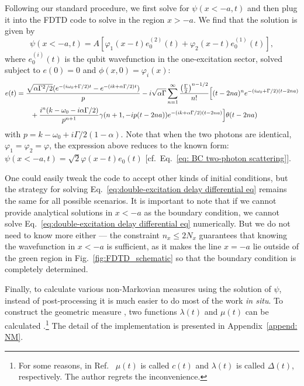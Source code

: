 \documentclass[12pt,letter,onecolumn,notitlepage]{article}
\begin{document}
\begin{enumerate}
Following our standard procedure, we first solve for $\psi(x<-a, t)$ and then plug it into the FDTD code to solve in the region $x>-a$. We find that the solution is given by \cite{OurBIC}
\begin{equation}
\psi(x<-a, t) = A \left[\varphi_1(x-t) e_0^{(2)}(t) + \varphi_2(x-t) e_0^{(1)}(t) \right],
\end{equation}
where $e_0^{(i)}(t)$ is the qubit wavefunction in the one-excitation sector, solved subject to $e(0)=0$ and $\phi(x,0)=\varphi_i(x)$:
\begin{align}
e(t)&=\frac{\sqrt{\alpha\Gamma^2/2} (e^{-(i\omega_0+\Gamma /2)t}-e^{-(ik+\alpha\Gamma/2)t})}{p} 
-i\sqrt{\alpha\Gamma} \sum_{n=1}^{\infty}\frac{\left(\frac{\Gamma}{2}\right)^{n-1/2}}{n!}
\Bigl[(t-2na)^n e^{-(i\omega_0+\Gamma/2)(t-2na)}\nonumber \\
&\quad\quad+\frac{i^n(k-\omega_0-i\alpha\Gamma/2)}{p^{n+1}}\gamma(n+1,-ip(t-2na))e^{-(ik+\alpha\Gamma/2)(t-2na)}
\Bigr]\theta(t-2na)
\label{eq:exact solution single-photon exponential}
\end{align}
with $p=k-\omega_0+i\Gamma/2(1-\alpha)$.
Note that when the two photons are identical, $\varphi_1=\varphi_2=\varphi$, the expression above reduces to the known form: $\psi(x<-a, t) = \sqrt{2}\varphi(x-t)e_0(t)$ [cf.\ Eq.~\eqref{eq: BC two-photon scattering}]. 
\end{enumerate}
One could easily tweak the code to accept other kinds of initial conditions, but the strategy for solving Eq.~\eqref{eq:double-excitation delay differential eq} remains the same for all possible scenarios. It is important to note that if we cannot provide analytical solutions in $x<-a$ as the boundary condition, we cannot solve Eq.~\eqref{eq:double-excitation delay differential eq} numerically. But we do not need to know more either --- the constraint $n_x\leq 2N_x$ guarantees that knowing the wavefunction in $x<-a$ is sufficient, as it makes the line $x=-a$ lie outside of the green region in Fig.~\ref{fig:FDTD_schematic} so that the boundary condition is completely determined. 

Finally, to calculate various non-Markovian measures using the solution of $\psi$, instead of post-processing it is much easier to do most of the work \textit{in situ}. To construct the geometric measure \cite{LorenzoPRA13}, two functions $\lambda(t)$ and $\mu(t)$ can be calculated \cite{FangNM17}.\footnote{For some reasons, in Ref.~\cite{FangNM17} $\mu(t)$ is called $c(t)$ and $\lambda(t)$ is called $\Delta(t)$, respectively. The author regrets the inconvenience.\label{note5}}
The detail of the implementation is presented in Appendix~\ref{append: NM}. 
\end{document}
